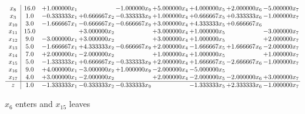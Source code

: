 \documentclass[10pt]{article}
\begin{document}
 \[\begin{array}{c| c c@{\hskip 2pt} c@{\hskip 2pt} c@{\hskip 2pt} c@{\hskip 2pt} c@{\hskip 2pt} c@{\hskip 2pt} c@{\hskip 2pt} }
 x_{8}   &  16.0 & + 1.000000 x_{1} &   & -1.000000 x_{9} & + 5.000000 x_{4} & + 4.000000 x_{5} & + 2.000000 x_{6} & -5.000000 x_{7}\\
 x_{3}   &  1.0 & -0.333333 x_{1} & + 0.666667 x_{2} & -0.333333 x_{9} & + 1.000000 x_{4} & + 0.666667 x_{5} & + 0.333333 x_{6} & -1.000000 x_{7}\\
 x_{10}   &  3.0 & -1.666667 x_{1} & -0.666667 x_{2} & -0.666667 x_{9} & + 3.000000 x_{4} & + 4.333333 x_{5} & + 0.666667 x_{6} &   \\
 x_{11}   &  15.0  &   & + 3.000000 x_{2} &   & + 3.000000 x_{4} & + 1.000000 x_{5} &   & -3.000000 x_{7}\\
 x_{12}   &  9.0 & -3.000000 x_{1} & + 3.000000 x_{2} &   & + 3.000000 x_{4} & + 1.000000 x_{5} &   & + 2.000000 x_{7}\\
 x_{13}   &  5.0 & -1.666667 x_{1} & + 4.333333 x_{2} & -0.666667 x_{9} & + 2.000000 x_{4} & -1.666667 x_{5} & + 1.666667 x_{6} & -2.000000 x_{7}\\
 x_{14}   &  7.0 & + 2.000000 x_{1} & -2.000000 x_{2} &   & + 1.000000 x_{4} & + 1.000000 x_{5} &   & + 1.000000 x_{7}\\
 x_{15}   &  5.0 & -1.333333 x_{1} & + 0.666667 x_{2} & -0.333333 x_{9} & + 2.000000 x_{4} & + 1.666667 x_{5} & -2.666667 x_{6} & -1.000000 x_{7}\\
 x_{16}   &  9.0 & + 4.000000 x_{1} & -3.000000 x_{2} & + 1.000000 x_{9} & -2.000000 x_{4} & -5.000000 x_{5} &    &   \\
 x_{17}   &  4.0 & + 3.000000 x_{1} & -2.000000 x_{2} &   & + 2.000000 x_{4} & -2.000000 x_{5} & -2.000000 x_{6} & + 3.000000 x_{7}\\
\hline
z    &  1.0 & -1.333333 x_{1} & -0.333333 x_{2} & -0.333333 x_{9} &   & -1.333333 x_{5} & + 2.333333 x_{6} & -1.000000 x_{7}\\
\end{array}\]


 $ x_{6} $ enters and $ x_{15} $ leaves 
\end{document}
